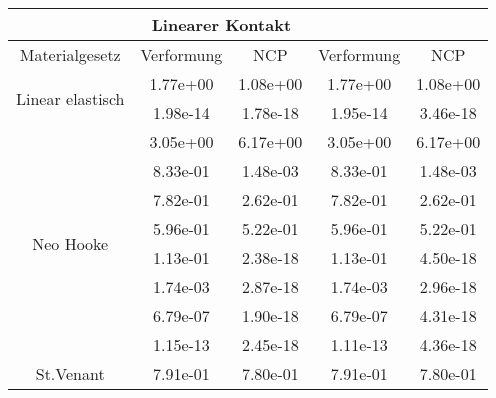 \begin{table} 
\centering 
\begin{tabular}{c|cc|cc|} 
\cline{2-5} 
 & \multicolumn{2}{|c|}{Linearer Kontakt} &  \\ 
\hline 
\multicolumn{1}{|c|}{Materialgesetz} & \multicolumn{1}{c|}{Verformung} & \multicolumn{1}{c|}{NCP} & \multicolumn{1}{c|}{Verformung} & \multicolumn{1}{c|}{NCP} \\ 
\hline 
\multicolumn{1}{|c|}{\multirow{2}{*}{Linear elastisch}} &\multicolumn{1}{|c|}{  1.77e+00} & \multicolumn{1}{|c|}{  1.08e+00} & \multicolumn{1}{|c|}{  1.77e+00} & \multicolumn{1}{|c|}{  1.08e+00} \\ 
\multicolumn{1}{|c|}{} & \multicolumn{1}{|c|}{  1.98e-14} & \multicolumn{1}{|c|}{  1.78e-18} & \multicolumn{1}{|c|}{  1.95e-14} & \multicolumn{1}{|c|}{  3.46e-18} \\ 
\hline 
\multicolumn{1}{|c|}{\multirow{8}{*}{Neo Hooke}} &\multicolumn{1}{|c|}{  3.05e+00} & \multicolumn{1}{|c|}{  6.17e+00} & \multicolumn{1}{|c|}{  3.05e+00} & \multicolumn{1}{|c|}{  6.17e+00} \\ 
\multicolumn{1}{|c|}{} & \multicolumn{1}{|c|}{  8.33e-01} & \multicolumn{1}{|c|}{  1.48e-03} & \multicolumn{1}{|c|}{  8.33e-01} & \multicolumn{1}{|c|}{  1.48e-03} \\ 
\multicolumn{1}{|c|}{} & \multicolumn{1}{|c|}{  7.82e-01} & \multicolumn{1}{|c|}{  2.62e-01} & \multicolumn{1}{|c|}{  7.82e-01} & \multicolumn{1}{|c|}{  2.62e-01} \\ 
\multicolumn{1}{|c|}{} & \multicolumn{1}{|c|}{  5.96e-01} & \multicolumn{1}{|c|}{  5.22e-01} & \multicolumn{1}{|c|}{  5.96e-01} & \multicolumn{1}{|c|}{  5.22e-01} \\ 
\multicolumn{1}{|c|}{} & \multicolumn{1}{|c|}{  1.13e-01} & \multicolumn{1}{|c|}{  2.38e-18} & \multicolumn{1}{|c|}{  1.13e-01} & \multicolumn{1}{|c|}{  4.50e-18} \\ 
\multicolumn{1}{|c|}{} & \multicolumn{1}{|c|}{  1.74e-03} & \multicolumn{1}{|c|}{  2.87e-18} & \multicolumn{1}{|c|}{  1.74e-03} & \multicolumn{1}{|c|}{  2.96e-18} \\ 
\multicolumn{1}{|c|}{} & \multicolumn{1}{|c|}{  6.79e-07} & \multicolumn{1}{|c|}{  1.90e-18} & \multicolumn{1}{|c|}{  6.79e-07} & \multicolumn{1}{|c|}{  4.31e-18} \\ 
\multicolumn{1}{|c|}{} & \multicolumn{1}{|c|}{  1.15e-13} & \multicolumn{1}{|c|}{  2.45e-18} & \multicolumn{1}{|c|}{  1.11e-13} & \multicolumn{1}{|c|}{  4.36e-18} \\ 
\hline 
\multicolumn{1}{|c|}{\multirow{101}{*}{St.Venant}} &\multicolumn{1}{|c|}{  7.91e-01} & \multicolumn{1}{|c|}{  7.80e-01} & \multicolumn{1}{|c|}{  7.91e-01} & \multicolumn{1}{|c|}{  7.80e-01} \\ 

\end{tabular}
\end{table}
